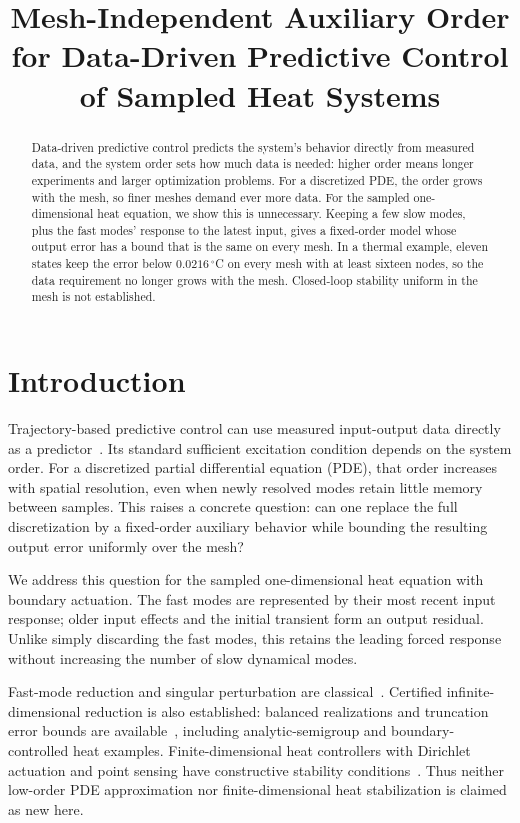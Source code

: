 \documentclass[letterpaper,10pt,conference]{ieeeconf}
\title{\LARGE\bf Mesh-Independent Auxiliary Order for Data-Driven Predictive Control of Sampled Heat Systems}
\theoremstyle{remark}\newtheorem{remark}{Remark}
\begin{document}
\maketitle
\thispagestyle{empty}\pagestyle{empty}

\begin{abstract}
Data-driven predictive control predicts the system's behavior directly from measured data, and the system order sets how much data is needed: higher order means longer experiments and larger optimization problems. For a discretized PDE, the order grows with the mesh, so finer meshes demand ever more data. For the sampled one-dimensional heat equation, we show this is unnecessary. Keeping a few slow modes, plus the fast modes' response to the latest input, gives a fixed-order model whose output error has a bound that is the same on every mesh. In a thermal example, eleven states keep the error below $0.0216\,^\circ$C on every mesh with at least sixteen nodes, so the data requirement no longer grows with the mesh. Closed-loop stability uniform in the mesh is not established.
\end{abstract}

\section{Introduction}
Trajectory-based predictive control can use measured input-output data directly as a predictor~\cite{willems,deepc}. Its standard sufficient excitation condition depends on the system order. For a discretized partial differential equation (PDE), that order increases with spatial resolution, even when newly resolved modes retain little memory between samples. This raises a concrete question: can one replace the full discretization by a fixed-order auxiliary behavior while bounding the resulting output error uniformly over the mesh?

We address this question for the sampled one-dimensional heat equation with boundary actuation. The fast modes are represented by their most recent input response; older input effects and the initial transient form an output residual. Unlike simply discarding the fast modes, this retains the leading forced response without increasing the number of slow dynamical modes.

Fast-mode reduction and singular perturbation are classical~\cite{phillips,fernando,liljegren}. Certified infinite-dimensional reduction is also established: balanced realizations and truncation error bounds are available~\cite{glover,guiver}, including analytic-semigroup and boundary-controlled heat examples. Finite-dimensional heat controllers with Dirichlet actuation and point sensing have constructive stability conditions~\cite{katz}. Thus neither low-order PDE approximation nor finite-dimensional heat stabilization is claimed as new here.
\end{document}
